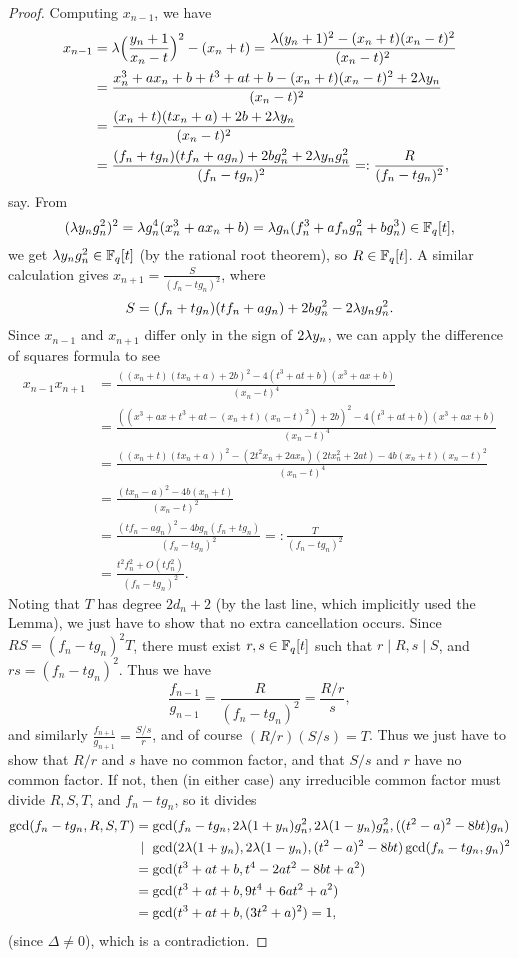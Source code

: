 \documentclass[letterpaper,11pt]{article}
\begin{document}
\begin{proof}
Computing $x_{n-1}$, we have
\begin{align*}
x_{n-1} &= \lambda\Big(\frac{y_n+1}{x_n-t}\Big)^2 - (x_n+t) = \frac{\lambda(y_n+1)^2-(x_n+t)(x_n-t)^2}{(x_n-t)^2}\\
&= \frac{x_n^3+ax_n+b+t^3+at+b-(x_n+t)(x_n-t)^2+2\lambda y_n}{(x_n-t)^2}\\
&= \frac{(x_n+t)(tx_n+a)+2b+2\lambda y_n}{(x_n-t)^2}\\
&= \frac{(f_n+tg_n)(tf_n+ag_n)+2bg_n^2+2\lambda y_ng_n^2}{(f_n-tg_n)^2} =: \frac{R}{(f_n-tg_n)^2},
\end{align*}
say. From
\[
(\lambda y_ng_n^2)^2 = \lambda g_n^4(x_n^3+ax_n+b) = \lambda g_n(f_n^3 + af_ng_n^2 + bg_n^3) \in \mathbb{F}_q[t],
\]
we get $\lambda y_ng_n^2 \in \mathbb{F}_q[t]$ (by the rational root theorem), so $R \in \mathbb{F}_q[t]$. A similar calculation gives $x_{n+1} = \frac{S}{(f_n-tg_n)^2}$, where \[
S = (f_n+tg_n)(tf_n+ag_n)+2bg_n^2-2\lambda y_ng_n^2.
\]
Since $x_{n-1}$ and $x_{n+1}$ differ only in the sign of $2\lambda y_n$, we can apply the difference of squares formula to see
\begin{align*}
x_{n-1}x_{n+1} &= \frac{((x_n+t)(tx_n+a)+2b)^2-4(t^3+at+b)(x^3+ax+b)}{(x_n-t)^4}\\
&= \frac{((x^3+ax+t^3+at-(x_n+t)(x_n-t)^2)+2b)^2-4(t^3+at+b)(x^3+ax+b)}{(x_n-t)^4}\\
&= \frac{((x_n+t)(tx_n+a))^2-(2t^2x_n+2ax_n)(2tx_n^2+2at)-4b(x_n+t)(x_n-t)^2}{(x_n-t)^4}\\
&= \frac{(tx_n-a)^2-4b(x_n+t)}{(x_n-t)^2}\\
&= \frac{(tf_n-ag_n)^2-4bg_n(f_n+tg_n)}{(f_n-tg_n)^2} =: \frac{T}{(f_n-tg_n)^2}\\
&= \frac{t^2f_n^2 + O(tf_n^2)}{(f_n-tg_n)^2}.
\end{align*}
Noting that $T$ has degree $2d_n+2$ (by the last line, which implicitly used the Lemma), we just have to show that no extra cancellation occurs. Since $RS = (f_n-tg_n)^2T$, there must exist $r,s\in\mathbb{F}_q[t]$ such that $r\mid R, s\mid S$, and $rs = (f_n-tg_n)^2$. Thus we have
\[
\frac{f_{n-1}}{g_{n-1}} = \frac{R}{(f_n-tg_n)^2} = \frac{R/r}{s},
\]
and similarly $\frac{f_{n+1}}{g_{n+1}} = \frac{S/s}{r}$, and of course $(R/r)(S/s) = T$. Thus we just have to show that $R/r$ and $s$ have no common factor, and that $S/s$ and $r$ have no common factor. If not, then (in either case) any irreducible common factor must divide $R,S,T$, and $f_n-tg_n$, so it divides
\begin{align*}
\gcd(f_n-tg_n,R,S,T) &= \gcd(f_n-tg_n, 2\lambda(1+y_n)g_n^2, 2\lambda(1-y_n)g_n^2, ((t^2-a)^2-8bt)g_n)\\
&\,\mid\ \gcd(2\lambda(1+y_n), 2\lambda(1-y_n), (t^2-a)^2-8bt)\gcd(f_n-tg_n,g_n)^2\\
&= \gcd(t^3+at+b, t^4 - 2at^2 - 8bt + a^2)\\
&= \gcd(t^3+at+b, 9t^4 + 6at^2 + a^2)\\
&= \gcd(t^3+at+b, (3t^2+a)^2) = 1,
\end{align*}
(since $\Delta \ne 0$), which is a contradiction.
\end{proof}
\end{document}
